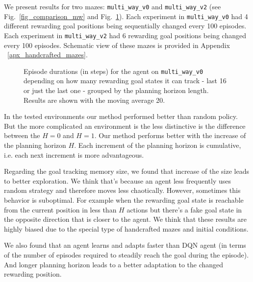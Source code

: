 \documentclass[a4paper,twoside]{article}
\begin{document}
We present results for two mazes: \texttt{multi\_way\_v0} and \texttt{multi\_way\_v2} (see Fig.~\ref{fig_comparison_mw} and Fig.~\ref{fig_detailed_mw0}). Each experiment in \texttt{multi\_way\_v0} had 4 different rewarding goal positions being sequentially changed every 100 episodes. Each experiment in \texttt{multi\_way\_v2} had 6 rewarding goal positions being changed every 100 episodes. Schematic view of these mazes is provided in Appendix ~\ref{apx_handcrafted_mazes}.

\begin{figure}
  \centering
  \begin{minipage}{\linewidth}
    
    \vspace*{10pt}

    
    \vspace*{6pt}
  \end{minipage}

  \caption{Episode durations (in steps) for the agent on \texttt{multi\_way\_v0} depending on how many rewarding goal states it can track - last 16 or just the last one - grouped by the planning horizon length. Results are shown with the moving average 20.} \label{fig_detailed_mw0}
\end{figure}

In the tested environments our method performed better than random policy. But the more complicated an environment is the less distinctive is the difference between the $H = 0$ and $H = 1$. Our method performs better with the increase of the planning horizon $H$. Each increment of the planning horizon is cumulative, i.e. each next increment is more advantageous.

Regarding the goal tracking memory size, we found that increase of the size leads to better exploration. We think that's because an agent less frequently uses random strategy and therefore moves less chaotically. However, sometimes this behavior is suboptimal. For example when the rewarding goal state is reachable from the current position in less than $H$ actions but there's a fake goal state in the opposite direction that is closer to the agent. We think that these results are highly biased due to the special type of handcrafted mazes and initial conditions.
  
We also found that an agent learns and adapts faster than DQN agent (in terms of the number of episodes required to steadily reach the goal during the episode). And longer planning horizon leads to a better adaptation to the changed rewarding position.
\end{document}
